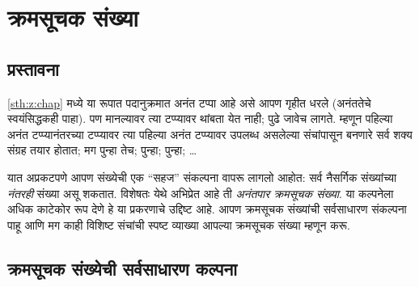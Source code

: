 \chapter{क्रमसूचक संख्या}\label{sth:ordinals:chap}









\section{प्रस्तावना}\label{sth:ordinals:intro:sec}

\ref{sth:z:chap} मध्ये \stagesinf{} या रूपात पदानुक्रमात अनंत टप्पा आहे असे आपण गृहीत धरले (अनंततेचे स्वयंसिद्धकही पाहा). पण \stagessucc{} मानल्यावर त्या टप्प्यावर थांबता येत नाही; पुढे जावेच लागते. म्हणून पहिल्या अनंत टप्प्यानंतरच्या टप्प्यावर त्या पहिल्या अनंत टप्प्यावर उपलब्ध असलेल्या संचांपासून बनणारे सर्व शक्य संग्रह तयार होतात; मग पुन्हा तेच; पुन्हा; पुन्हा; \dots

यात अप्रकटपणे आपण संख्येची एक ``सहज'' संकल्पना वापरू लागलो आहोत: सर्व नैसर्गिक संख्यांच्या \emph{नंतरही} संख्या असू शकतात. विशेषतः येथे अभिप्रेत आहे ती \emph{अनंतपार क्रमसूचक संख्या}. या कल्पनेला अधिक काटेकोर रूप देणे हे या प्रकरणाचे उद्दिष्ट आहे. आपण क्रमसूचक संख्यांची सर्वसाधारण संकल्पना पाहू आणि मग काही विशिष्ट संचांची स्पष्ट व्याख्या आपल्या क्रमसूचक संख्या म्हणून करू.







\section{क्रमसूचक संख्येची सर्वसाधारण कल्पना}\label{sth:ordinals:idea:sec}

